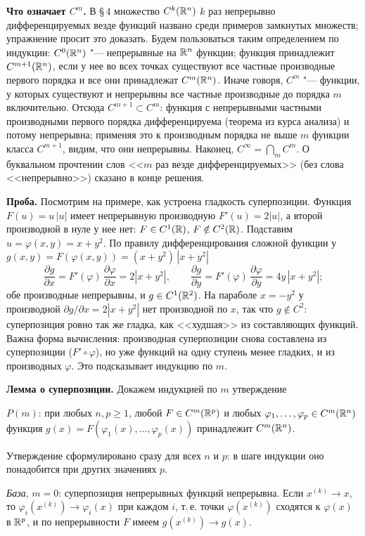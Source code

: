 \begin{solution}[1 (\S\,5)]
\textbf{Что означает $C^m$.} В \S\,4 множество $C^k(\mathbb R^n)$ $k$ раз
непрерывно дифференцируемых везде функций названо среди примеров замкнутых
множеств; упражнение просит это доказать. Будем пользоваться таким
определением по индукции: $C^0(\mathbb R^n)$ "--- непрерывные на $\mathbb R^n$ функции;
функция принадлежит $C^{m+1}(\mathbb R^n)$, если у нее во всех точках существуют
все частные производные первого порядка и все они принадлежат $C^m(\mathbb R^n)$.
Иначе говоря, $C^m$ "--- функции, у которых существуют и непрерывны все
частные производные до порядка $m$ включительно. Отсюда $C^{m+1}\subset C^m$:
функция с непрерывными частными производными первого порядка
дифференцируема (теорема из курса анализа) и потому непрерывна; применяя
это к производным порядка не выше $m$ функции класса $C^{m+1}$, видим, что
они непрерывны. Наконец, $C^\infty=\bigcap_mC^m$. О буквальном прочтении
слов <<$m$ раз везде дифференцируемых>> (без слова <<непрерывно>>) сказано
в конце решения.

\textbf{Проба.} Посмотрим на примере, как устроена гладкость суперпозиции.
Функция $F(u)=u\,|u|$ имеет непрерывную производную $F'(u)=2|u|$, а второй
производной в нуле у нее нет: $F\in C^1(\mathbb R)$, $F\notin C^2(\mathbb R)$. Подставим
$u=\varphi(x,y)=x+y^2$. По правилу дифференцирования сложной функции у
$g(x,y)=F(\varphi(x,y))=(x+y^2)\,|x+y^2|$
\[
\frac{\partial g}{\partial x}=F'(\varphi)\,\frac{\partial\varphi}{\partial x}=2|x+y^2|,\qquad
\frac{\partial g}{\partial y}=F'(\varphi)\,\frac{\partial\varphi}{\partial y}=4y\,|x+y^2|;
\]
обе производные непрерывны, и $g\in C^1(\mathbb R^2)$. На параболе $x=-y^2$ у
производной $\partial g/\partial x=2|x+y^2|$ нет производной по $x$, так что
$g\notin C^2$: суперпозиция ровно так же гладка, как <<худшая>> из
составляющих функций. Важна форма вычисления: производная суперпозиции
снова составлена из суперпозиции ($F'\circ\varphi$), но уже функций на одну
ступень менее гладких, и из производных $\varphi$. Это подсказывает индукцию
по $m$.

\textbf{Лемма о суперпозиции.} Докажем индукцией по $m$ утверждение
\begin{keystmt}
$P(m)$: при любых $n,p\ge1$, любой $F\in C^m(\mathbb R^p)$ и любых
$\varphi_1,\dots,\varphi_p\in C^m(\mathbb R^n)$ функция
$g(x)=F(\varphi_1(x),\dots,\varphi_p(x))$ принадлежит $C^m(\mathbb R^n)$.
\end{keystmt}
Утверждение сформулировано сразу для всех $n$ и $p$: в шаге индукции оно
понадобится при других значениях $p$.

\emph{База}, $m=0$: суперпозиция непрерывных функций непрерывна. Если
$x^{(k)}\to x$, то $\varphi_i(x^{(k)})\to\varphi_i(x)$ при каждом $i$, т.\,е.
точки $\varphi(x^{(k)})$ сходятся к $\varphi(x)$ в $\mathbb R^p$, и по
непрерывности $F$ имеем $g(x^{(k)})\to g(x)$.


\end{solution}
